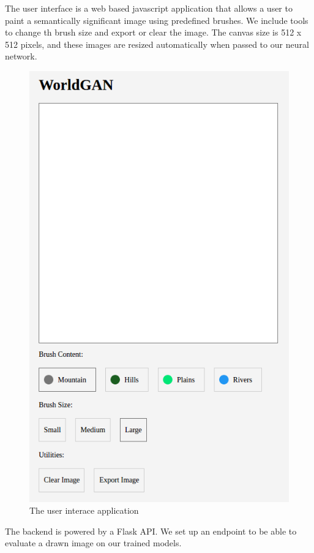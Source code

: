 \documentclass[twocolumn]{article}
\begin{document}
	The user interface is a web based javascript application that allows a user to paint a semantically significant image using predefined brushes. We include tools to change th brush size and export or clear the image. The canvas size is 512 x 512 pixels, and these images are resized automatically when passed to our neural network.

	\begin{figure}[h!]
	\includegraphics[width=1\columnwidth]{ui.png} 
	\caption{The user interace application}
	\end{figure}
	
	The backend is powered by a Flask API. We set up an endpoint to be able to evaluate a drawn image on our trained models.
	
\end{document}
